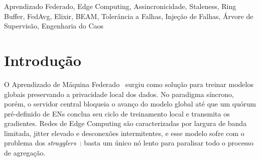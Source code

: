 \documentclass[conference,a4paper]{IEEEtran}
\begin{document}
\begin{abstract}
(mediana de $\statExpRThreeAggregatorMedian$\,ms para o Aggregator e $\statExpRThreeEdgeNodeMedian$\,ms para o EdgeNode,
respectivamente). Ainda assim, a correção não elimina toda a resiliência
residual: um terceiro experimento mostra que, se o próprio processo
herdeiro morrer antes do processo que ele protege,
\textbf{\statExpRFiveHeirDeadPct{}\% do
conteúdo é perdido}. Trata-se de um gap real, confirmado mas ainda não
corrigido nesta versão do trabalho. Uma validação adicional em rede real
(nós BEAM distribuídos entre containers Docker conectados por TCP/IP
genuíno, não \texttt{Process.sleep}) reproduz o mesmo speedup em ordem de
grandeza ($\statExpADistSpeedup$ real vs.\ $\statExpASpeedup$ simulado),
confirmando que a simulação de latência usada nos demais experimentos não
é um artefato. O sistema é validado ainda com treino
federado \textbf{real}: um MLP sobre partições non-IID do MNIST via
\textit{Axon}, e não só tensores sintéticos, confirmando speedup de
\textbf{$\statExpASpeedup$} sobre FedAvg síncrono sob \textit{stragglers}
($p<\statExpAPValue$), preservação de \textbf{\statExpCPreservationFiftyBFive\%} dos gradientes sob 50\% de
desconexão via ring buffer, e uma comparação empírica direta, e não só
qualitativa, com SSP~\cite{ho2013} e FedAsync~\cite{xie2019}. Essa
comparação revela um resultado misto e é reportada como tal: o AFL supera
uma barreira de staleness limitada inspirada em SSP em throughput sob
\textit{stragglers} extremos, mas perde para o FedAsync bem-ajustado em
velocidade de convergência ($p<10^{-4}$), vantagem que desaparece sob um
hiperparâmetro mal-ajustado. A causa é um passo de mistura que decai
como $\mathcal{O}(1/t)$, uma limitação real da regra de agregação do
AFL, não do seu mecanismo de resiliência.
\end{abstract}

\begin{IEEEkeywords}
Aprendizado Federado, Edge Computing, Assincronicidade, Staleness,
Ring Buffer, FedAvg, Elixir, BEAM, Tolerância a Falhas, Injeção de Falhas,
Árvore de Supervisão, Engenharia do Caos
\end{IEEEkeywords}

\section{Introdução}

O Aprendizado de Máquina Federado~\cite{mcmahan2017} surgiu como solução
para treinar modelos globais preservando a privacidade local dos dados.
No paradigma síncrono, porém, o servidor central bloqueia o avanço do modelo
global até que um quórum pré-definido de ENs conclua seu ciclo de treinamento
local e transmita os gradientes. Redes de Edge Computing são caracterizadas
por largura de banda limitada, jitter elevado e desconexões intermitentes, e
esse modelo sofre com o problema dos \textit{stragglers}~\cite{li2020survey}:
basta um único nó lento para paralisar todo o processo de agregação.
\end{document}
